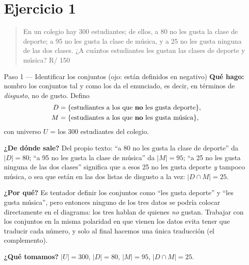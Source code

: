 \documentclass[11pt]{article}
\begin{document}
\section*{Ejercicio 1}

\begin{quote}
En un colegio hay 300 estudiantes; de ellos, a 80 no les gusta la clase de deporte; a 95 no les gusta la
clase de música, y a 25 no les gusta ninguna de las dos clases. ¿A cuántos estudiantes les gustan las
clases de deporte y música? \hfill R/ 150
\end{quote}

\begin{paso}{Paso 1 --- Identificar los conjuntos (ojo: están definidos en negativo)}
\textbf{Qué hago:} nombro los conjuntos tal y como los da el enunciado, es decir, en términos de
\emph{disgusto}, no de gusto. Defino
\[
\begin{aligned}
D&=\{\text{estudiantes a los que \textbf{no} les gusta deporte}\},\\
M&=\{\text{estudiantes a los que \textbf{no} les gusta música}\},
\end{aligned}
\]
con universo $U$ = los 300 estudiantes del colegio.

\textbf{¿De dónde sale?} Del propio texto: ``a 80 no les gusta la clase de deporte'' da $|D|=80$; ``a 95
no les gusta la clase de música'' da $|M|=95$; ``a 25 no les gusta ninguna de las dos clases'' significa
que a esos 25 no les gusta deporte \emph{y} tampoco música, o sea que están en las dos listas de disgusto
a la vez: $|D\cap M|=25$.

\textbf{¿Por qué?} Es tentador definir los conjuntos como ``les gusta deporte'' y ``les gusta música'',
pero entonces ninguno de los tres datos se podría colocar directamente en el diagrama: los tres hablan de
quienes \emph{no} gustan. Trabajar con los conjuntos en la misma polaridad en que vienen los datos evita
tener que traducir cada número, y solo al final hacemos una única traducción (el complemento).

\textbf{¿Qué tomamos?} $|U|=300$, $|D|=80$, $|M|=95$, $|D\cap M|=25$.
\end{paso}
\end{document}
